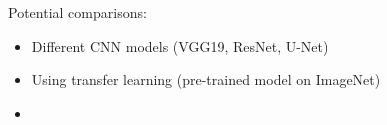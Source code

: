 Potential comparisons:

\begin{itemize}
    \item Different CNN models (VGG19, ResNet, U-Net)
    \item Using transfer learning (pre-trained model on ImageNet)
    \item 
\end{itemize}